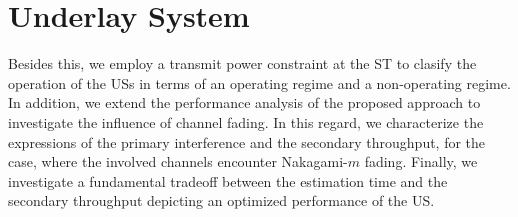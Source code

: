 \chapter{Underlay System}
\label{chapter:US}

Besides this, we employ a transmit power constraint at the ST to clasify the operation of the USs in terms of an operating regime and a non-operating regime. In addition, we extend the performance analysis of the proposed approach to investigate the influence of channel fading. In this regard, we characterize the expressions of the primary interference and the secondary throughput, for the case, where the involved channels encounter Nakagami-$m$ fading. Finally, we investigate a fundamental tradeoff between the estimation time and the secondary throughput depicting an optimized performance of the US. 

